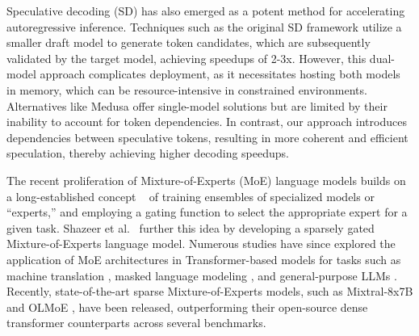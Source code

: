 Speculative decoding (SD) has also emerged as a potent method for accelerating autoregressive inference. Techniques such as the original SD framework \cite{leviathan2023fast,chen2023accelerating} utilize a smaller draft model to generate token candidates, which are subsequently validated by the target model, achieving speedups of 2-3x. However, this dual-model approach complicates deployment, as it necessitates hosting both models in memory, which can be resource-intensive in constrained environments. Alternatives like Medusa offer single-model solutions but are limited by their inability to account for token dependencies. In contrast, our approach introduces dependencies between speculative tokens, resulting in more coherent and efficient speculation, thereby achieving higher decoding speedups.

The recent proliferation of Mixture-of-Experts (MoE) language models builds on a long-established concept ~\cite{jacobs1991adaptive, jordan1994hierarchical} of training ensembles of specialized models or ``experts,'' and employing a gating function to select the appropriate expert for a given task. Shazeer et al.~\cite{shazeer2017outrageously} further this idea by developing a sparsely gated Mixture-of-Experts language model. Numerous studies have since explored the application of MoE architectures in Transformer-based models for tasks such as machine translation \cite{lepikhin2021gshard}, masked language modeling \cite{fedus2021switch}, and general-purpose LLMs \cite{du2022glam}. Recently, state-of-the-art sparse Mixture-of-Experts models, such as Mixtral-8x7B \cite{jiang2024mixtral} and OLMoE \cite{muennighoff2024olmoe}, have been released, outperforming their open-source dense transformer counterparts across several benchmarks.





